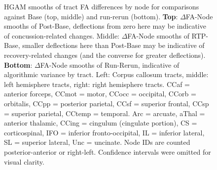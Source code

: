 \documentclass[12pt]{article}
\begin{document}
\begin{figure}[H]
	\centering
	\caption{HGAM smooths of tract FA differences by node for comparisons against Base (top, middle) and run-rerun (bottom). \textbf{Top}: $\Delta$FA-Node smooths of Post-Base, deflections from zero here may be indicative of concussion-related changes. Middle: $\Delta$FA-Node smooths of RTP-Base, smaller deflections here than Post-Base may be indicative of recovery-related changes (and the converse for greater deflections). \textbf{Bottom}: $\Delta$FA-Node smooths of Run-Rerun, indicative of algorithmic variance by tract. Left: Corpus callosum tracts, middle: left hemisphere tracts, right: right hemisphere tracts. CCaf = anterior forceps, CCmot = motor, CCocc = occipital, CCorb = orbitalis, CCpp = posterior parietal, CCsf = superior frontal, CCsp = superior parietal, CCtemp = temporal. Arc = arcuate, aThal = anterior thalamic, CCing = cingulum (cingulate portion), CS = corticospinal, IFO = inferior fronto-occipital, IL = inferior lateral, SL = superior lateral, Unc = uncinate. Node IDs are counted posterior-anterior or right-left. Confidence intervals were omitted for visual clarity.}
	\label{fig:ldi-gam}
\end{figure}
\end{document}
